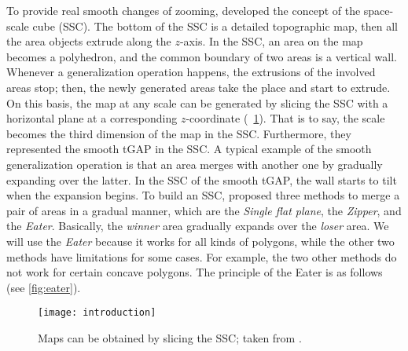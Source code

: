 \documentclass[twocolumn]{svjour3}          %
\begin{document}
To provide real smooth changes of zooming, \citet{vanOosterom2014Support}
developed the concept of the space-scale cube (SSC).
The bottom of the SSC is a detailed topographic map,
then all the area objects extrude along the $z$-axis.
In the SSC, an area on the map becomes a polyhedron, and
the common boundary of two areas is a vertical wall.
Whenever a generalization operation happens, 
the extrusions of the involved areas stop;
then, the newly generated areas take the place and start to extrude.
On this basis, the map at any scale can be generated by slicing the SSC 
with a horizontal plane at a corresponding $z$-coordinate 
(\eg~\fig\ref{fig:slicing}).
That is to say, the scale becomes the third dimension of the map in the SSC.
Furthermore, they represented the smooth tGAP in the SSC.
A typical example of the smooth generalization operation is that 
an area merges with another one by gradually expanding over the latter.
In the SSC of the smooth tGAP, 
the wall starts to tilt when the expansion begins.
To build an SSC, \citet{Suba2014Merge} proposed three methods 
to merge a pair of areas in a gradual manner, 
which are the \emph{Single flat plane}, 
the \emph{Zipper}, and the \emph{Eater}.
Basically, the \emph{winner} area gradually expands over the \emph{loser} area.
We will use the \emph{Eater} because it works for all kinds of polygons,
while the other two methods have limitations for some cases.
For example, the two other methods do not work for certain concave polygons.
The principle of the Eater is as follows (see \fig\ref{fig:eater}).




\begin{figure}[tb]
\centering
\texttt{[image: introduction]}
\caption{Maps can be obtained by slicing the SSC;
taken from \citet{Meijers2020Web}.}
\label{fig:slicing}
\end{figure}
\end{document}
